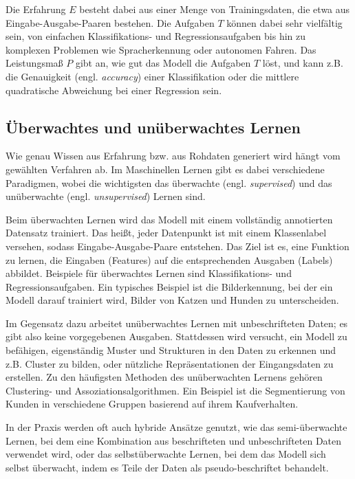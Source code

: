 Die Erfahrung $E$ besteht dabei aus einer Menge von Trainingsdaten, die etwa aus Eingabe-Ausgabe-Paaren bestehen. Die Aufgaben $T$ können dabei sehr vielfältig sein, von einfachen Klassifikations- und Regressionsaufgaben bis hin zu komplexen Problemen wie Spracherkennung oder autonomen Fahren. Das Leistungsmaß $P$ gibt an, wie gut das Modell die Aufgaben $T$ löst, und kann z.B. die Genauigkeit (engl. \textit{accuracy}) einer Klassifikation oder die mittlere quadratische Abweichung bei einer Regression sein.

\subsection{Überwachtes und unüberwachtes Lernen}

Wie genau Wissen aus Erfahrung bzw. aus Rohdaten generiert wird hängt vom gewählten Verfahren ab. Im Maschinellen Lernen gibt es dabei verschiedene Paradigmen, wobei die wichtigsten das überwachte (engl. \textit{supervised}) und das unüberwachte (engl. \textit{unsupervised}) Lernen sind.

Beim überwachten Lernen wird das Modell mit einem vollständig annotierten Datensatz trainiert. Das heißt, jeder Datenpunkt ist mit einem Klassenlabel versehen, sodass Eingabe-Ausgabe-Paare entstehen. Das Ziel ist es, eine Funktion zu lernen, die Eingaben (Features) auf die entsprechenden Ausgaben (Labels) abbildet. Beispiele für überwachtes Lernen sind Klassifikations- und Regressionsaufgaben. Ein typisches Beispiel ist die Bilderkennung, bei der ein Modell darauf trainiert wird, Bilder von Katzen und Hunden zu unterscheiden.

Im Gegensatz dazu arbeitet unüberwachtes Lernen mit unbeschrifteten Daten; es gibt also keine vorgegebenen Ausgaben. Stattdessen wird versucht, ein Modell zu befähigen, eigenständig Muster und Strukturen in den Daten zu erkennen und z.B. Cluster zu bilden, oder nützliche Repräsentationen der Eingangsdaten zu erstellen. Zu den häufigsten Methoden des unüberwachten Lernens gehören Clustering- und Assoziationsalgorithmen. Ein Beispiel ist die Segmentierung von Kunden in verschiedene Gruppen basierend auf ihrem Kaufverhalten. \parencite{}

In der Praxis werden oft auch hybride Ansätze genutzt, wie das semi-überwachte Lernen, bei dem eine Kombination aus beschrifteten und unbeschrifteten Daten verwendet wird, oder das selbstüberwachte Lernen, bei dem das Modell sich selbst überwacht, indem es Teile der Daten als pseudo-beschriftet behandelt.

